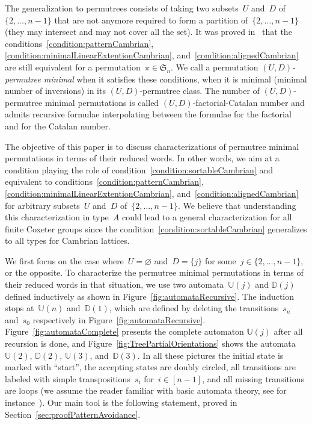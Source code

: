 \documentclass[ALCO]{cedram}
\newcommand{\fS}{\mathfrak{S}}
\newcommand{\defn}[1]{\textsl{\color{darkblue} #1}}
\newcommand{\automatonU}{\mathbb{U}}
\newcommand{\automatonD}{\mathbb{D}}
\begin{document}
The generalization to permutrees consists of taking two subsets~$U$ and~$D$ of~$\{2, \dots, n-1\}$ that are not anymore required to form a partition of~$\{2, \dots, n-1\}$ (they may intersect and may not cover all the set).
It was proved in~\cite{PilaudPons-permutrees, ChatelPilaudPons} that the conditions~\ref{condition:patternCambrian}, \ref{condition:minimalLinearExtentionCambrian}, and~\ref{condition:alignedCambrian} are still equivalent for a permutation~$\pi \in \fS_n$.
We call a permutation \defn{$(U,D)$-permutree minimal} when it satisfies these conditions, \ie when it is minimal (minimal number of inversions) in its $(U,D)$-permutree class.
The number of $(U,D)$-permutree minimal permutations is called $(U,D)$-factorial-Catalan number and admits recursive formulae interpolating between the formulae for the factorial and for the Catalan number.

The objective of this paper is to discuss characterizations of permutree minimal permutations in terms of their reduced words.
In other words, we aim at a condition playing the role of condition~\ref{condition:sortableCambrian} and equivalent to conditions~\ref{condition:patternCambrian}, \ref{condition:minimalLinearExtentionCambrian}, and~\ref{condition:alignedCambrian} for arbitrary subsets~$U$ and~$D$ of~$\{2, \dots, n-1\}$.
We believe that understanding this characterization in type~$A$ could lead to a general characterization for all finite Coxeter groups since the condition~\ref{condition:sortableCambrian} generalizes to all types for Cambrian lattices.

We first focus on the case where~$U = \varnothing$ and~$D = \{j\}$ for some~${j \in \{2, \dots, n-1\}}$, or the opposite.
To characterize the permutree minimal permutations in terms of their reduced words in that situation, we use two automata~$\automatonU(j)$ and $\automatonD(j)$ defined inductively as shown in Figure~\ref{fig:automataRecursive}.
The induction stops at~$\automatonU(n)$ and~$\automatonD(1)$, which are defined by deleting the transitions~$s_n$ and~$s_0$ respectively in Figure~\ref{fig:automataRecursive}.
Figure~\ref{fig:automataComplete} presents the complete automaton $\automatonU(j)$ after all recursion is done, and Figure~\ref{fig:TreePartialOrientations} shows the automata~$\automatonU(2)$, $\automatonD(2)$, $\automatonU(3)$, and~$\automatonD(3)$.
In all these pictures the initial state is marked with ``start'', the accepting states are doubly circled, all transitions are labeled with simple transpositions~$s_i$ for~$i \in [n-1]$, and all missing transitions are loops (we assume the reader familiar with basic automata theory, see for instance~\cite{HopcroftUllman}).
Our main tool is the following statement, proved in Section~\ref{sec:proofPatternAvoidance}.
\end{document}
